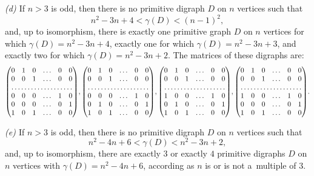 \documentclass[11pt]{llncs}
\begin{document}
\begin{theorem}
\emph{(d) \cite[Theorem~8]{DM64}} If $n>3$ is odd, then there is no
primitive digraph $D$ on $n$ vertices such that
\begin{equation}
\label{first odd gap}
n^2-3n+4<\gamma(D)<(n-1)^2,
\end{equation}
and, up to isomorphism, there is exactly one primitive graph $D$ on $n$ vertices
for which $\gamma(D)=n^2-3n+4$, exactly one for which $\gamma(D)=n^2-3n+3$, and
exactly two for which $\gamma(D)=n^2-3n+2$. The matrices of these digraphs
are:
\begin{equation}
\label{odd island}
\begin{pmatrix}
0 & 1 & 0 & \dots & 0 & 0\\
0 & 0 & 1 & \dots & 0 & 0\\
\hdotsfor{6}\\
0 & 0 & 0 & \dots & 1 & 0\\
0 & 0 & 0 & \dots & 0 & 1\\
1 & 0 & 1 & \dots & 0 & 0
\end{pmatrix}\!,
\begin{pmatrix}
0 & 1 & 0 & \dots & 0 & 0\\
0 & 0 & 1 & \dots & 0 & 0\\
\hdotsfor{6}\\
0 & 0 & 0 & \dots & 1 & 0\\
0 & 1 & 0 & \dots & 0 & 1\\
1 & 0 & 1 & \dots & 0 & 0
\end{pmatrix}\!,
\begin{pmatrix}
0 & 1 & 0 & \dots & 0 & 0\\
0 & 0 & 1 & \dots & 0 & 0\\
\hdotsfor{6}\\
1 & 0 & 0 & \dots & 1 & 0\\
0 & 1 & 0 & \dots & 0 & 1\\
1 & 0 & 1 & \dots & 0 & 0
\end{pmatrix}\!,
\begin{pmatrix}
0 & 1 & 0 & \dots & 0 & 0\\
0 & 0 & 1 & \dots & 0 & 0\\
\hdotsfor{6}\\
1 & 0 & 0 & \dots & 1 & 0\\
0 & 0 & 0 & \dots & 0 & 1\\
1 & 0 & 1 & \dots & 0 & 0
\end{pmatrix}\!.
\end{equation}

\emph{(e) \cite[Theorem~8]{DM64}} If $n>3$ is odd, then there is no
primitive digraph $D$ on $n$ vertices such that
\begin{equation}
\label{second odd gap}
n^2-4n+6<\gamma(D)<n^2-3n+2,
\end{equation}
and, up to isomorphism, there are exactly $3$ or exactly $4$ primitive digraphs $D$
on $n$ vertices with $\gamma(D)=n^2-4n+6$, according as $n$ is or is not
a~multiple of $3$.
\end{theorem}
\end{document}
